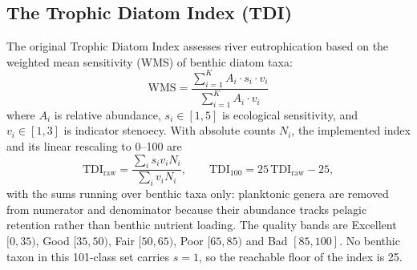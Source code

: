 \documentclass[10pt,twocolumn,a4paper]{article}
\begin{document}
\subsection{The Trophic Diatom Index (TDI)}
The original Trophic Diatom Index \cite{kelly1995trophic} assesses river eutrophication based on the weighted mean sensitivity (WMS) of benthic diatom taxa:
\begin{equation}
\text{WMS} = \frac{\sum_{i=1}^{K} A_i \cdot s_i \cdot v_i}{\sum_{i=1}^{K} A_i \cdot v_i}
\end{equation}
where $A_i$ is relative abundance, $s_i \in [1, 5]$ is ecological sensitivity, and $v_i \in [1, 3]$ is indicator stenoecy. With absolute counts $N_i$, the implemented index and its linear rescaling to 0--100 are
\begin{equation}
\text{TDI}_{\text{raw}} = \frac{\sum_i s_i v_i N_i}{\sum_i v_i N_i}, \qquad
\text{TDI}_{100} = 25\,\text{TDI}_{\text{raw}} - 25,
\end{equation}
with the sums running over benthic taxa only: planktonic genera are removed from numerator and denominator because their abundance tracks pelagic retention rather than benthic nutrient loading. The quality bands are Excellent $[0,35)$, Good $[35,50)$, Fair $[50,65)$, Poor $[65,85)$ and Bad $[85,100]$. No benthic taxon in this 101-class set carries $s = 1$, so the reachable floor of the index is 25.
\end{document}
